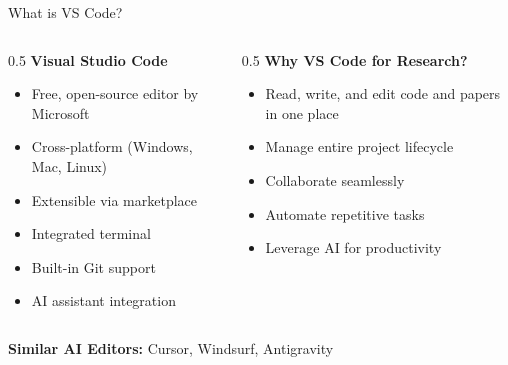 \documentclass[11pt,aspectratio=169]{beamer}
\begin{document}
\begin{frame}{What is VS Code?}
\begin{columns}[t]
\begin{column}[t]{0.5\textwidth}
\textbf{Visual Studio Code}
\vspace{0.2cm}
\begin{itemize}
    \setlength{\itemsep}{0.3cm}
    \item Free, open-source editor by Microsoft
    \item Cross-platform (Windows, Mac, Linux)
    \item Extensible via marketplace
    \item Integrated terminal
    \item Built-in Git support
    \item AI assistant integration
\end{itemize}
\end{column}

\begin{column}[t]{0.5\textwidth}
\textbf{Why VS Code for Research?}
\vspace{0.2cm}
\begin{itemize}
    \setlength{\itemsep}{0.3cm}
    \item Read, write, and edit code and papers in one place
    \item Manage entire project lifecycle
    \item Collaborate seamlessly
    \item Automate repetitive tasks
    \item Leverage AI for productivity
\end{itemize}
\end{column}
\end{columns}

\vspace{0.5cm}
\textbf{Similar AI Editors:} Cursor, Windsurf, Antigravity
\end{frame}
\end{document}
